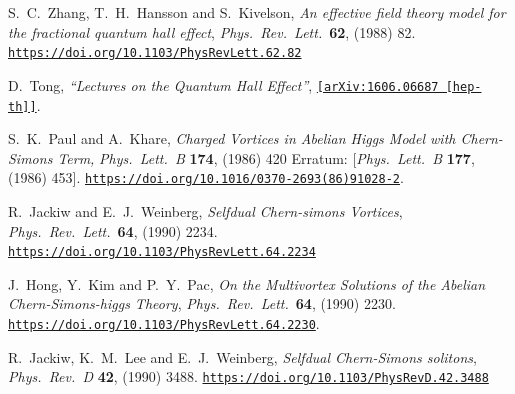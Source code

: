   \begin{thebibliography}{99} 
  S.~C.~Zhang, T.~H.~Hansson and S.~Kivelson,
  {\it An effective field theory model for the fractional quantum hall effect},
  {\it Phys.\ Rev.\ Lett.}\  {\bf 62}, (1988) 82.
  \href{https://doi.org/10.1103/PhysRevLett.62.82}{\tt https://doi.org/10.1103/PhysRevLett.62.82}
  
  D.~Tong,
 {\it ``Lectures on the Quantum Hall Effect''},
  \href{https://arxiv.org/abs/1606.06687}{\tt[arXiv:1606.06687 [hep-th]]}.
  
  S.~K.~Paul and A.~Khare,
  {\it Charged Vortices in Abelian Higgs Model with Chern-Simons Term,}
  {\it Phys.\ Lett.\ B} {\bf 174}, (1986) 420
  Erratum: [{\it Phys.\ Lett.\ B} {\bf 177}, (1986) 453].
 \href{https://doi.org/10.1016/0370-2693(86)91028-2}{\tt https://doi.org/10.1016/0370-2693(86)91028-2}.

  R.~Jackiw and E.~J.~Weinberg,
  {\it Selfdual Chern-simons Vortices},
  {\it Phys.\ Rev.\ Lett.}\  {\bf 64}, (1990) 2234.
  \href{https://doi.org/10.1103/PhysRevLett.64.2234}{\tt https://doi.org/10.1103/PhysRevLett.64.2234}


  J.~Hong, Y.~Kim and P.~Y.~Pac,
  {\it On the Multivortex Solutions of the Abelian {Chern-Simons}-higgs Theory},
  {\it Phys.\ Rev.\ Lett.}\  {\bf 64},  (1990) 2230.
  \href{https://doi.org/10.1103/PhysRevLett.64.2230}{\tt https://doi.org/10.1103/PhysRevLett.64.2230}.
  
  R.~Jackiw, K.~M.~Lee and E.~J.~Weinberg,
  {\it Selfdual Chern-Simons solitons},
  {\it Phys.\ Rev.\ D} {\bf 42}, (1990) 3488.
 \href{https://doi.org/10.1103/PhysRevD.42.3488}{\tt https://doi.org/10.1103/PhysRevD.42.3488}
  


\end{thebibliography}
